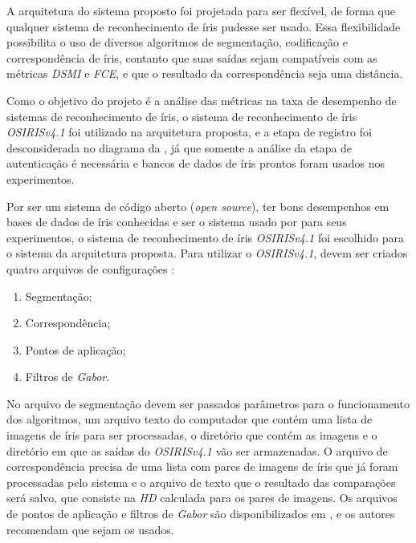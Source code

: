 \par A arquitetura do sistema proposto foi projetada para ser flexível, de forma que qualquer sistema de reconhecimento de íris pudesse ser usado. Essa flexibilidade possibilita o uso de diversos algoritmos de segmentação, codificação e correspondência de íris, contanto que suas saídas sejam compatíveis com as métricas \textit{\acrshort{DSMI}} e \textit{\acrshort{FCE}}, e que o resultado da correspondência seja uma distância.

\par Como o objetivo do projeto é a análise das métricas na taxa de desempenho de sistemas de reconhecimento de íris, o sistema de reconhecimento de íris \textit{OSIRISv4.1} \cite{othman2015, osirisv41, osirisv41_doc} foi utilizado na arquitetura proposta, e a etapa de registro foi desconsiderada no diagrama da , já que somente a análise da etapa de autenticação é necessária e bancos de dados de íris prontos foram usados nos experimentos.

\par Por ser um sistema de código aberto (\textit{open source}), ter bons desempenhos em bases de dados de íris conhecidas e ser o sistema usado por \cite{Jenadeleh_2018_CVPR_Workshops} para seus experimentos, o sistema de reconhecimento de íris \textit{OSIRISv4.1} foi escolhido para o sistema da arquitetura proposta. Para utilizar o \textit{OSIRISv4.1}, devem ser criados quatro arquivos de configurações \cite{osirisv41_doc}:

\begin{enumerate}
    \item Segmentação;
    \item Correspondência;
    \item Pontos de aplicação;
    \item Filtros de \textit{Gabor}.
\end{enumerate}

\par No arquivo de segmentação devem ser passados parâmetros para o funcionamento dos algoritmos, um arquivo texto do computador que contém uma lista de imagens de íris para ser processadas, o diretório que contém as imagens e o diretório em que as saídas do \textit{OSIRISv4.1} vão ser armazenadas. O arquivo de correspondência precisa de uma lista com pares de imagens de íris que já foram processadas pelo sistema e o arquivo de texto que o resultado das comparações será salvo, que consiste na \textit{\acrshort{HD}} calculada para os pares de imagens. Os arquivos de pontos de aplicação e filtros de \textit{Gabor} são disponibilizados em \cite{osirisv41}, e os autores recomendam que sejam os usados.

